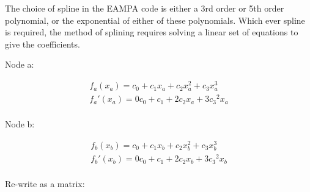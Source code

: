 The choice of spline in the EAMPA code is either a 3rd order or 5th order polynomial, or the exponential of either of these polynomials.  Which ever spline is required, the method of splining requires solving a linear set of equations to give the coefficients.

Node a:

\begin{equation}
\begin{split}
f_a(x_a) = c_0 + c_1 x_a + c_2 x_a^2 + c_3 x_a^3  \\
f_a'(x_a) = 0 c_0 + c_1 + 2 c_2 x_a + 3 {c_3}^2 x_a  \\
\end{split}
\label{eq:eqFinnisSinclair}
\end{equation}


Node b:

\begin{equation}
\begin{split}
f_b(x_b) = c_0 + c_1 x_b + c_2 x_b^2 + c_3 x_b^3  \\
f_b'(x_b) = 0 c_0 + c_1 + 2 c_2 x_b + 3 {c_3}^2 x_b  \\
\end{split}
\label{eq:eqFinnisSinclair}
\end{equation}

Re-write as a matrix:

\newcommand{\eqMehlStrainA}{
  \begin{equation}
    \begin{split}
      \begin{bmatrix}
      1 & x_a & x_a^2 & x_a^3  \\ 
      0 & 1 & x_a & x_a^2 \\ 
      1 & x_b & x_b^2 & x_b^3  \\ 
      0 & 1 & x_b & x_b^2 \\ 
      \end{bmatrix}
      \begin{bmatrix}
      c_0 & c_1 & c_2 & c_3  \\ 
      \end{bmatrix}
      =
      \begin{bmatrix}
      f_a(x_a) & f_a'(x_a) & f_b(x_b) & f_b'(x_b)  \\ 
      \end{bmatrix}
    \end{split}
    \label{eq:splineFitting}
  \end{equation}
}










